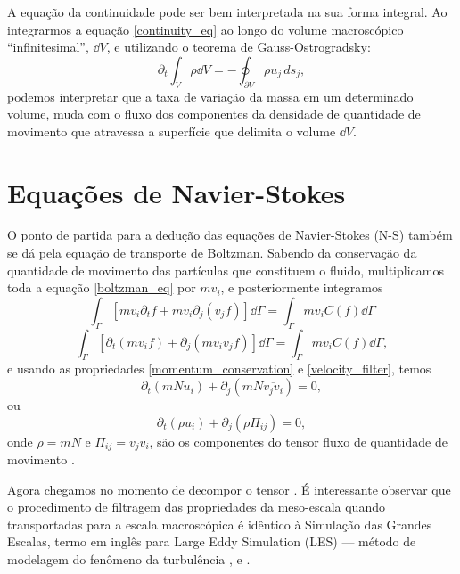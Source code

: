 A equação da continuidade pode ser bem interpretada na sua forma integral. Ao integrarmos a equação \ref{continuity_eq} ao longo do volume macroscópico “infinitesimal”, $\dd V$, e utilizando o teorema de Gauss-Ostrogradsky: 
\begin{equation*}
\partial_{t}\int_{V}\rho \dd V = -\oint_{\partial V} \rho u_{j} \,ds_{j},
\end{equation*}
podemos interpretar que a taxa de variação da massa em um determinado volume, muda com o fluxo dos componentes da densidade de quantidade de movimento que atravessa a superfície que delimita o volume $\dd V$.

\section{Equações de Navier-Stokes}
O ponto de partida para a dedução das equações de Navier-Stokes (N-S) também se dá pela equação de transporte de Boltzman. Sabendo da conservação da quantidade de movimento das partículas que constituem o fluido, multiplicamos toda a equação \ref{boltzman_eq} por $mv_{i}$, e posteriormente integramos 
\begin{equation*}
\int_{\Gamma}[mv_{i}\partial_{t}f + mv_{i}\partial_{j}(v_{j}f) ]\dd\Gamma = \int_{\Gamma} mv_{i}C(f) \dd\Gamma
\end{equation*}
\begin{equation*}
\int_{\Gamma}[\partial_{t}(mv_{i}f) + \partial_{j}(mv_{i}v_{j}f) ]\dd\Gamma = \int_{\Gamma} mv_{i}C(f) \dd\Gamma,
\end{equation*}
e usando as propriedades \ref{momentum_conservation} e \ref{velocity_filter}, temos
\begin{equation*}
\partial_{t}(mNu_{i})+ \partial_{j} (mN\overline{v_{j}v_{i}})= 0,
\end{equation*}
ou
\begin{equation}\label{NS_f1}
\partial_{t}(\rho u_{i})+ \partial_{j} (\rho\Pi_{ij})= 0,
\end{equation}
onde $\rho = mN$ e $\Pi_{ij} = \overline{v_{j}v_{i}}$, são os componentes do tensor fluxo de quantidade de movimento \cite{pitaevskii2012physical}.

Agora chegamos no momento de decompor o tensor \boldsymbol{\Pi}. É interessante observar que o procedimento de filtragem das propriedades da meso-escala quando transportadas para a escala macroscópica é idêntico à Simulação das Grandes Escalas, termo em inglês para Large Eddy Simulation (LES) — método de modelagem do fenômeno da turbulência \cite{catta2018implementaccao}, \cite{sagaut2006large} e \cite{pope2000turbulent}.

